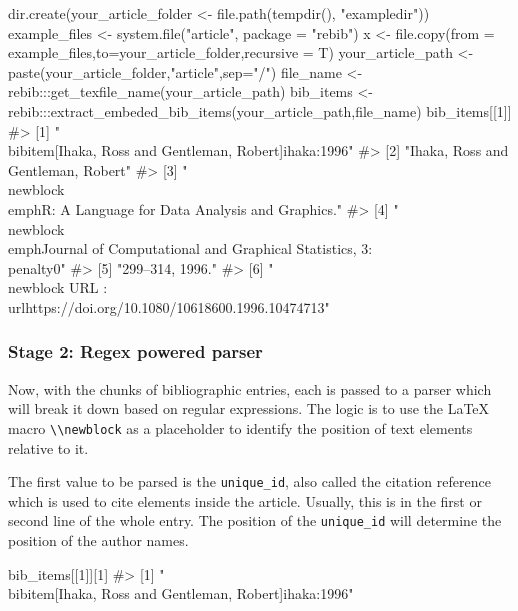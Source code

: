 \begin{Sinput}
dir.create(your_article_folder <- file.path(tempdir(), "exampledir"))
example_files <-  system.file("article", package = "rebib")
x <- file.copy(from = example_files,to=your_article_folder,recursive = T)
your_article_path <- paste(your_article_folder,"article",sep="/")
file_name <- rebib:::get_texfile_name(your_article_path)
bib_items <- rebib:::extract_embeded_bib_items(your_article_path,file_name)
bib_items[[1]]
#> [1] "\\bibitem[Ihaka, Ross and Gentleman, Robert]{ihaka:1996}"                          
#> [2] "Ihaka, Ross and Gentleman, Robert"                                                 
#> [3] "\\newblock \\emph{R: A Language for Data Analysis and Graphics.}"                  
#> [4] "\\newblock \\emph{Journal of Computational and Graphical Statistics}, 3:\\penalty0"
#> [5] "299--314, 1996."                                                                   
#> [6] "\\newblock URL : \\url{https://doi.org/10.1080/10618600.1996.10474713}"
\end{Sinput}


\subsubsection{Stage 2: Regex powered parser}


Now, with the chunks of bibliographic entries, each is passed to a parser which will break it down based on regular expressions.
The logic is to use the LaTeX macro \verb|\\newblock| as a placeholder to identify the position of text elements relative to it.

The first value to be parsed is the \verb|unique_id|, also called the citation reference which is used to cite elements inside the article. Usually, this is in the first or second line of the whole entry. The position of the 
\verb|unique_id| will determine the position of the author names.

\begin{Soutput}
bib_items[[1]][1]
#> [1] "\\bibitem[Ihaka, Ross and Gentleman, Robert]{ihaka:1996}"
\end{Soutput}

